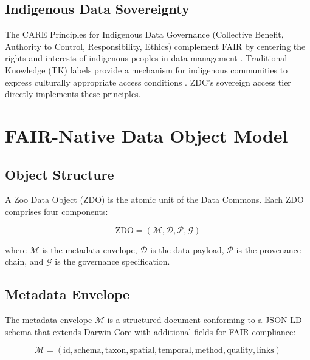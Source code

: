 \documentclass[11pt,a4paper]{article}
\begin{document}
\subsection{Indigenous Data Sovereignty}

The CARE Principles for Indigenous Data Governance (Collective Benefit, Authority to Control, Responsibility, Ethics) complement FAIR by centering the rights and interests of indigenous peoples in data management \citep{carroll2020care}.
Traditional Knowledge (TK) labels provide a mechanism for indigenous communities to express culturally appropriate access conditions \citep{anderson2010tk}.
ZDC's sovereign access tier directly implements these principles.

\section{FAIR-Native Data Object Model}
\label{sec:data_model}

\subsection{Object Structure}

A Zoo Data Object (ZDO) is the atomic unit of the Data Commons.
Each ZDO comprises four components:

\begin{equation}
    \text{ZDO} = (\mathcal{M}, \mathcal{D}, \mathcal{P}, \mathcal{G})
\end{equation}

\noindent where $\mathcal{M}$ is the metadata envelope, $\mathcal{D}$ is the data payload, $\mathcal{P}$ is the provenance chain, and $\mathcal{G}$ is the governance specification.

\subsection{Metadata Envelope}

The metadata envelope $\mathcal{M}$ is a structured document conforming to a JSON-LD schema that extends Darwin Core with additional fields for FAIR compliance:

\begin{equation}
    \mathcal{M} = (\text{id}, \text{schema}, \text{taxon}, \text{spatial}, \text{temporal}, \text{method}, \text{quality}, \text{links})
\end{equation}
\end{document}
